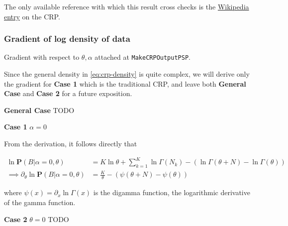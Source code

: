 \documentclass[12pt]{article}
\begin{document}
The only available reference with which this result cross checks is the
\href{https://en.wikipedia.org/wiki/Chinese_restaurant_process#Generalization}
{Wikipedia entry} on the CRP.

\subsubsection{Gradient of log density of data}

Gradient with respect to $\theta, \alpha$ attached at \texttt{MakeCRPOutputPSP}.

Since the general density in \eqref{eq:crp-density} is quite complex, we will derive
only the gradient for \textbf{Case 1} which is the traditional CRP,
and leave both \textbf{General Case} and \textbf{Case 2} for a
future exposition.

\textbf{General Case} TODO

\textbf{Case 1} $\alpha = 0$

From the derivation, it follows directly that

\begin{align*}
\ln\mathbf{P}(B|\alpha=0,\theta)
    & = K\ln\theta + \sum_{k=1}^{K}\ln\Gamma(N_k) -(\ln\Gamma(\theta+N)-\ln\Gamma(\theta))\\
\implies \partial_\theta\ln\mathbf{P}(B|\alpha=0,\theta)
    &= \frac{K}{\theta} - (\psi(\theta+N) - \psi(\theta))
\end{align*}

where $\psi(x) = \partial_x\ln\Gamma(x)$ is the digamma function, the logarithmic
derivative of the gamma function.

\textbf{Case 2} $\theta = 0$ TODO
\end{document}
